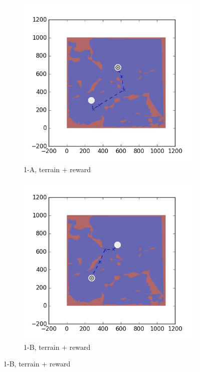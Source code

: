\documentclass{tamuccthesis}
\begin{document}
\begin{figure}[H]
    \begin{subfigure}[b]{0.35\textwidth}
        \centering
        \includegraphics[width=\textwidth,trim={3cm 3cm 3cm 3cm},clip]{EXP3RG_PathAa_-1_-1_0_-1.png}
        \caption{{\small1-A, terrain + reward}}    
        \label{fig:Path_1-A_terrain_reward}
    \end{subfigure}
    \hfill
    \begin{subfigure}[b]{0.35\textwidth}  
        \centering 
        \includegraphics[width=\textwidth,trim={3cm 3cm 3cm 3cm},clip]{EXP3RG_PathAb_-1_-1_0_-1.png}
        \caption{{\small1-B, terrain + reward}}   
        \label{fig:Path_1-B_terrain_reward}
    \end{subfigure}
   

\end{figure}
\end{document}
